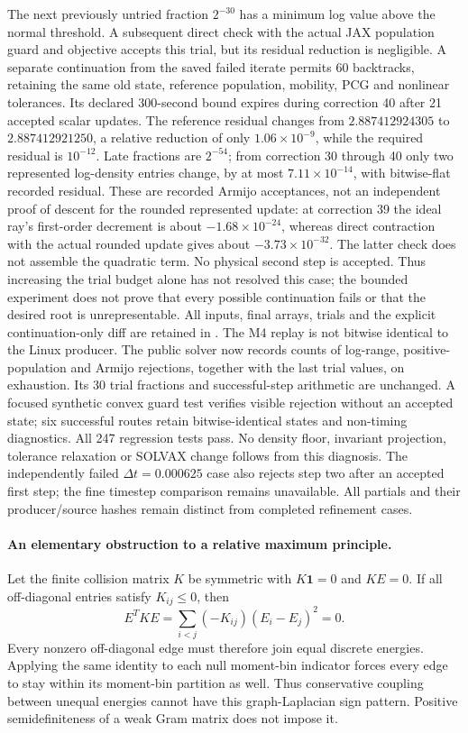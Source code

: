 \documentclass[11pt,letterpaper]{article}
\begin{document}
The next previously untried fraction $2^{-30}$ has a minimum log value
above the normal threshold. A subsequent direct check with the actual JAX
population guard and objective accepts this trial, but its residual reduction
is negligible. A separate continuation from the saved failed iterate permits
60 backtracks, retaining the same old state, reference population, mobility,
PCG and nonlinear tolerances. Its declared 300-second bound expires during
correction 40 after 21 accepted scalar updates. The reference residual changes
from $2.887412924305$ to $2.887412921250$, a relative reduction of only
$1.06\times10^{-9}$, while the required residual is $10^{-12}$. Late fractions
are $2^{-54}$; from correction 30 through 40 only two represented log-density
entries change, by at most $7.11\times10^{-14}$, with bitwise-flat recorded
residual. These are recorded Armijo acceptances, not an independent proof
of descent for the rounded represented update: at correction 39 the ideal
ray's first-order decrement is about $-1.68\times10^{-24}$, whereas direct
contraction with the actual rounded update gives about
$-3.73\times10^{-32}$. The latter check does not assemble the quadratic
term. No physical second step is accepted. Thus increasing the trial
budget alone has not resolved this case; the bounded experiment does not
prove that every possible continuation fails or that the desired root is
unrepresentable. All inputs, final arrays, trials and the explicit
continuation-only diff are retained in
.
The M4 replay is not bitwise identical to the Linux producer.
The public solver now records counts of log-range, positive-population and
Armijo rejections, together with the last trial values, on exhaustion.
Its 30 trial fractions and successful-step arithmetic are unchanged. A
focused synthetic convex guard test verifies visible rejection without an
accepted state; six successful routes retain bitwise-identical states and
non-timing diagnostics. All 247 regression tests pass.
No density floor, invariant projection, tolerance relaxation or SOLVAX
change follows from this diagnosis. The independently failed
$\Delta t=0.000625$ case also rejects step two after an accepted first step;
the fine timestep comparison remains unavailable. All partials and their
producer/source hashes remain distinct from completed refinement cases.

\paragraph{An elementary obstruction to a relative maximum principle.}
Let the finite collision matrix $K$ be symmetric with $K\bm1=0$ and
$KE=0$. If all off-diagonal entries satisfy $K_{ij}\le0$, then
\[
 E^TKE=\sum_{i<j}(-K_{ij})(E_i-E_j)^2=0.
\]
Every nonzero off-diagonal edge must therefore join equal discrete energies.
Applying the same identity to each null moment-bin indicator forces every
edge to stay within its moment-bin partition as well. Thus conservative
coupling between unequal energies cannot have this graph-Laplacian sign
pattern. Positive semidefiniteness of a weak Gram matrix does not impose it.
\end{document}
